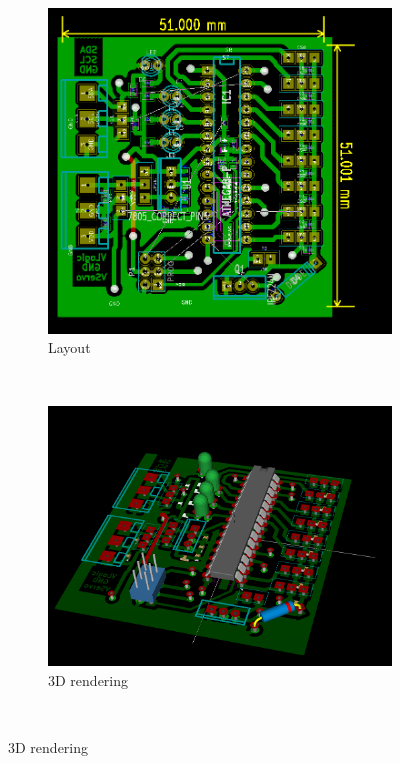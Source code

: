 \documentclass[a4paper
               ,10pt
               ,DIV=10 %
               ,BCOR=0.3cm
               ,pagesize %
               ,headings=small
               ,bibtotoc
               ]
               {scrartcl}
\begin{document}
\begin{figure}[H]
  \centering
  \begin{subfigure}[b]{0.3\textwidth}
    \centering
    \includegraphics[width=\textwidth]{pic/servoboardbrd.png}
    \caption{Layout}
  \end{subfigure}~
  \begin{subfigure}[b]{0.3\textwidth}
    \centering
    \includegraphics[width=\textwidth]{pic/servoboard3d.png}
    \caption{3D rendering}
  \end{subfigure}~

\end{figure}
\end{document}
